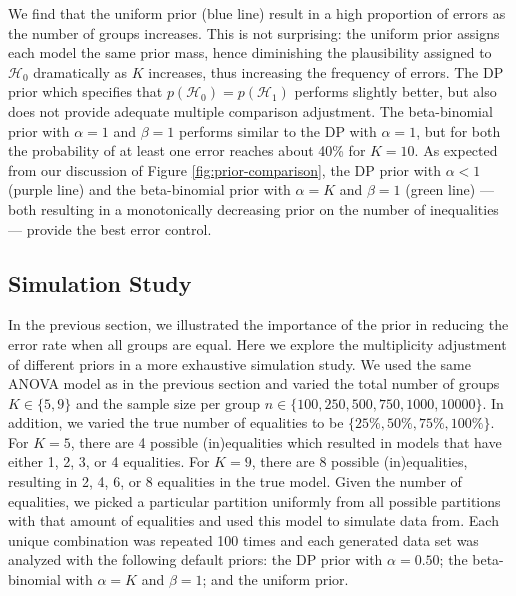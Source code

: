 \documentclass[11pt,a4paper]{article}
\theoremstyle{definition} %
\theoremstyle{case}
\begin{document}
We find that the uniform prior (blue line) result in a high proportion of errors as the number of groups increases. This is not surprising: the uniform prior assigns each model the same prior mass, hence diminishing the plausibility assigned to $\mathcal{H}_0$ dramatically as $K$ increases, thus increasing the frequency of errors. The DP prior which specifies that $p(\mathcal{H}_0) = p(\mathcal{H}_1)$ performs slightly better, but also does not provide adequate multiple comparison adjustment. The beta-binomial prior with $\alpha = 1$ and $\beta = 1$ performs similar to the DP with $\alpha = 1$, but for both the probability of at least one error reaches about 40\% for $K = 10$. As expected from our discussion of Figure \ref{fig:prior-comparison}, the DP prior with $\alpha < 1$ (purple line) and the beta-binomial prior with $\alpha = K$ and $\beta = 1$ (green line) --- both resulting in a monotonically decreasing prior on the number of inequalities --- provide the best error control.


\subsection{Simulation Study} \label{sec:simulation}
In the previous section, we illustrated the importance of the prior in reducing the error rate when all groups are equal. Here we explore the multiplicity adjustment of different priors in a more exhaustive simulation study. We used the same ANOVA model as in the previous section and varied the total number of groups $K \in \{5, 9\}$ and the sample size per group $n \in \{100, 250, 500, 750, 1000, 10000\}$. In addition, we varied the true number of equalities to be $\{25\%, 50\%, 75\%, 100\%\}$. For $K = 5$, there are 4 possible (in)equalities which resulted in models that have either 1, 2, 3, or 4 equalities. For $K = 9$, there are 8 possible (in)equalities, resulting in 2, 4, 6, or 8 equalities in the true model. Given the number of equalities, we picked a particular partition uniformly from all possible partitions with that amount of equalities and used this model to simulate data from. Each unique combination was repeated 100 times and each generated data set was analyzed with the following default priors: the DP prior with $\alpha = 0.50$; the beta-binomial with $\alpha = K$ and $\beta = 1$; and the uniform prior. 
\end{document}

